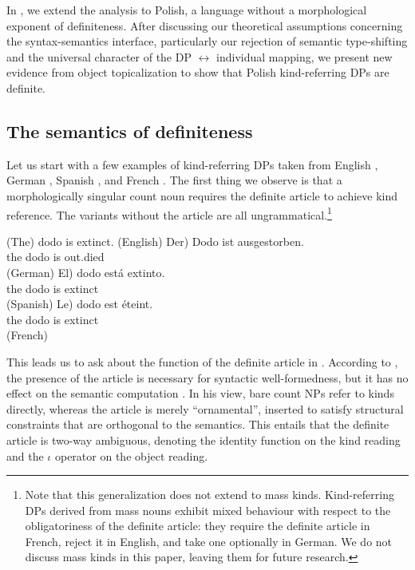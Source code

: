 \documentclass[output=paper,
colorlinks,
citecolor=brown,
newtxmath
]{langscibook}
\begin{document}
In , we extend the analysis to Polish, a language without a morphological exponent of definiteness. After discussing our theoretical assumptions concerning the syntax-semantics interface, particularly our rejection of semantic type-shifting and the universal character of the DP $\leftrightarrow$ individual mapping, we present new evidence from object topicalization to show that Polish kind-referring DPs are definite.

\subsection{The semantics of definiteness}
\label{sec:sem_def}

Let us start with a few examples of kind-referring DPs taken from English , German , Spanish , and French . The first thing we observe is that a morphologically singular count noun requires the definite article to achieve kind reference. The variants without the article are all ungrammatical.\footnote{Note that this generalization does not extend to mass kinds. Kind-referring DPs derived from mass nouns exhibit mixed behaviour with respect to the obligatoriness of the definite article: they require the definite article in French, reject it in English, and take one optionally in German. We do not discuss mass kinds in this paper, leaving them for future research.}

\ea \label{ex:kind-ref-crossling}
\ea *(The) dodo is extinct.\label{ex:kind-ref-en} \hfill (English)
\ex \gll \minsp{*(} Der) Dodo ist ausgestorben.\label{ex:kind-ref-ger}\\
{} the dodo is out.died \\ \hfill (German)
\ex  \gll \minsp{*(} El) dodo está extinto.\label{ex:kind-ref-spa}\\
       {} the dodo is extinct\\ \hfill (Spanish)
\ex \gll \minsp{*(} Le) dodo est éteint.\label{ex:kind-ref-fr}\\
       {} the dodo is extinct\\ \hfill (French)
\z\z

\noindent
This leads us to ask about the function of the definite article in . According to \citet{Krifka1995}, the presence of the article is necessary for syntactic well-formedness, but it has no effect on the semantic computation . In his view, bare count NPs refer to kinds directly, whereas the article is merely ``ornamental'', inserted to satisfy structural constraints that are orthogonal to the semantics. This entails that the definite article is two-way ambiguous, denoting the identity function on the kind reading and the $\iota$ operator on the object reading.
\end{document}
